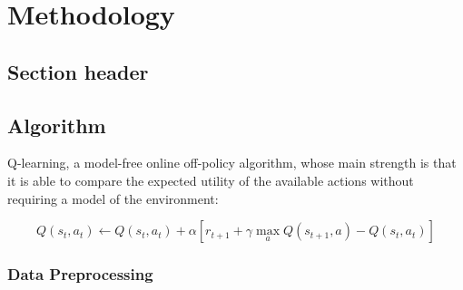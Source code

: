 \chapter{Methodology}

\section{Section header}

\section{Algorithm}

Q-learning, a model-free online off-policy algorithm, whose main strength is that it is able to compare the expected utility of the available actions without requiring a model of the environment:

\begin{equation}
        Q(s_t, a_t) \gets Q(s_t, a_t) + \alpha [r_{t+1} + \gamma \max_a Q(s_{t+1}, a) - Q(s_t, a_t)]
\end{equation}

\subsection{Data Preprocessing}

